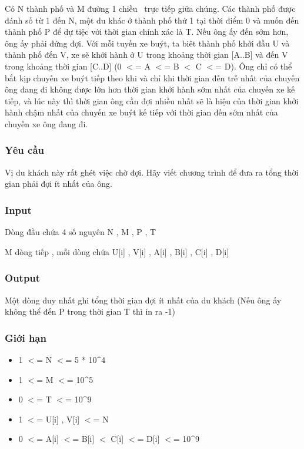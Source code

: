 

Có N thành phố và M đường 1 chiều  trực tiếp giữa chúng. Các thành phố được đánh số từ 1 đến N, một du khác ở thành phố thứ 1 tại thời điểm 0 và muốn đến thành phố P để dự tiệc với thời gian chính xác là T. Nếu ông ấy đến sớm hơn, ông ấy phải đứng đợi. Với mỗi tuyến xe buýt, ta biêt thành phố khởi đầu U và thành phố đến V, xe sẽ khởi hành ở U trong khoảng thời gian [A..B] và đến V trong khoảng thời gian [C..D] (0 $<$= A $<$= B $<$ C $<$= D). Ông chỉ có thể bắt kịp chuyến xe buýt tiếp theo khi và chỉ khi thời gian đến trễ nhất của chuyến ông đang đi không được lớn hơn thời gian khởi hành sớm nhất của chuyến xe kế tiếp, và lúc này thì thời gian ông cần đợi nhiều nhất sẽ là hiệu của thời gian khởi hành chậm nhất của chuyến xe buýt kế tiếp với thời gian đến sớm nhất của chuyến xe ông đang đi.

\subsubsection{Yêu cầu}

Vị du khách này rất ghét việc chờ đợi. Hãy viết chương trình để đưa ra tổng thời gian phải đợi ít nhất của ông.

\subsubsection{Input}

Dòng đầu chứa 4 số nguyên N , M , P , T

M dòng tiếp , mỗi dòng chứa U[i] , V[i] , A[i] , B[i] , C[i] , D[i]

\subsubsection{Output}

Một dòng duy nhất ghi tổng thời gian đợi ít nhất của du khách (Nếu ông ấy không thể đến P trong thời gian T thì in ra -1)

\subsubsection{Giới hạn}
\begin{itemize}
	\item 1 $<$= N $<$= 5 * 10\textasciicircum4
	\item 1 $<$= M $<$= 10\textasciicircum5
	\item 0 $<$= T $<$= 10\textasciicircum9
	\item 1 $<$= U[i] , V[i] $<$= N
	\item 0 $<$= A[i] $<$= B[i] $<$ C[i] $<$= D[i] $<$= 10\textasciicircum9
\end{itemize}

